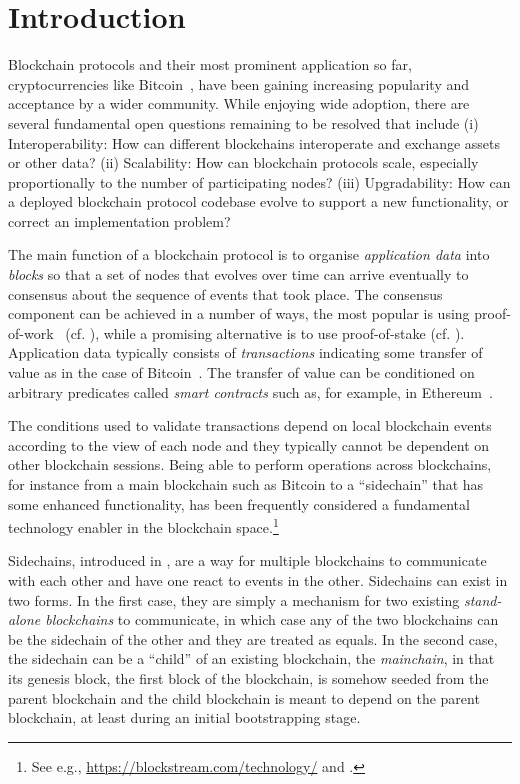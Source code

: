 \section{Introduction}


Blockchain protocols and their most
prominent application so far,  cryptocurrencies like Bitcoin~\cite{bitcoin},
have been gaining increasing popularity and acceptance by
a wider community.   While enjoying wide adoption,
there  are several fundamental open questions remaining to be resolved
that include (i)
         Interoperability:
           How can different blockchains interoperate and exchange
           assets or other data?
(ii)  Scalability:
           How can blockchain protocols scale, especially proportionally to the number of           participating nodes?
(iii)
         Upgradability:
           How can a deployed blockchain protocol codebase evolve to support a new
           functionality, or correct an implementation problem?

The main function of a blockchain protocol  is to organise \textit{application
data} into \textit{blocks} so that a set of nodes that evolves over time can
arrive eventually to consensus about the sequence of events that took place.
The consensus component can be achieved in a number of ways, the most popular
is using proof-of-work~\cite{C:DwoNao92} (cf. \cite{bitcoin,EC:GarKiaLeo15}),
while a promising alternative is to use proof-of-stake
(cf. \cite{algorand,C:KRDO17,EPRINT:BenPasShi16b,EC:DGKR18}).
Application data typically
consists of \textit{transactions} indicating some transfer of value as in the
case of Bitcoin~\cite{bitcoin}.  The transfer of value can be conditioned on
arbitrary predicates called \textit{smart contracts} such as, for example, in
Ethereum~\cite{buterin,wood}.

The conditions used to validate transactions %
depend on local blockchain events according to the view of each node and they
typically cannot be dependent on other blockchain sessions. Being
able to perform operations across blockchains, for instance from a main blockchain
such as Bitcoin to a ``sidechain'' that has some enhanced functionality, has been
frequently considered  a fundamental technology enabler in the blockchain space.\footnote{See
e.g., \url{https://blockstream.com/technology/} and \cite{sidechains}.  }


Sidechains, introduced in \cite{sidechains},  are a
way for multiple blockchains to communicate with each other and have one react
to events in the other. Sidechains can exist in two forms. In the first case, they are simply a mechanism for two
existing \textit{stand-alone blockchains} to communicate, in which case any of
the two blockchains can be the sidechain of the other and they are treated as
equals. In the second case, the
sidechain can be a ``child'' of an existing blockchain, the \textit{mainchain},
in that its genesis block, the first block of the blockchain, is somehow seeded
from the parent blockchain and the child blockchain is meant to depend on the
parent blockchain, at least during an initial bootstrapping stage.

